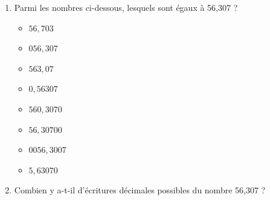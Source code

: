 \documentclass[activite]{thedocument}
\begin{document}
    \begin{enumerate}
    \item Parmi les nombres ci-dessous, lesquels sont égaux à 56,307 ?
    \begin{mdframed}
        \begin{minipage}[t]{.45\linewidth}
            \begin{itemize}[label=$ $]
                \item$56,703$
                \item$056,307$
                \item$563,07$
                \item$0,56307$
            \end{itemize}
        \end{minipage}
        \begin{minipage}[t]{.5\linewidth}
            \begin{itemize}[label=$ $]
                \item$560,3070$
                \item$56,30700$
                \item$0056,3007$
                \item$5,63070$
            \end{itemize}
        \end{minipage}
    \end{mdframed}
    \item Combien y a-t-il d'écritures décimales possibles du nombre 56,307 ?
    \end{enumerate}
\end{document}
